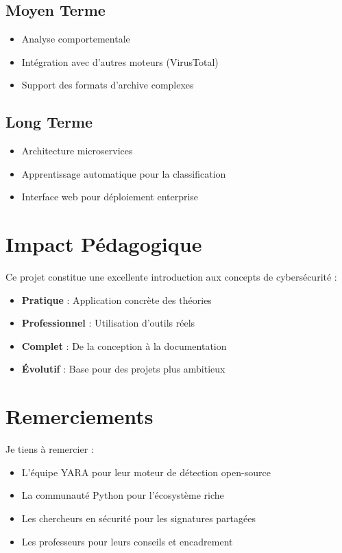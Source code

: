 \documentclass[12pt,a4paper]{report}
\begin{document}
\subsection{Moyen Terme}
\begin{itemize}
    \item Analyse comportementale
    \item Intégration avec d'autres moteurs (VirusTotal)
    \item Support des formats d'archive complexes
\end{itemize}

\subsection{Long Terme}
\begin{itemize}
    \item Architecture microservices
    \item Apprentissage automatique pour la classification
    \item Interface web pour déploiement enterprise
\end{itemize}

\section{Impact Pédagogique}

Ce projet constitue une excellente introduction aux concepts de cybersécurité :

\begin{itemize}
    \item \textbf{Pratique} : Application concrète des théories
    \item \textbf{Professionnel} : Utilisation d'outils réels
    \item \textbf{Complet} : De la conception à la documentation
    \item \textbf{Évolutif} : Base pour des projets plus ambitieux
\end{itemize}

\section{Remerciements}

Je tiens à remercier :
\begin{itemize}
    \item L'équipe YARA pour leur moteur de détection open-source
    \item La communauté Python pour l'écosystème riche
    \item Les chercheurs en sécurité pour les signatures partagées
    \item Les professeurs pour leurs conseils et encadrement
\end{itemize}
\end{document}
